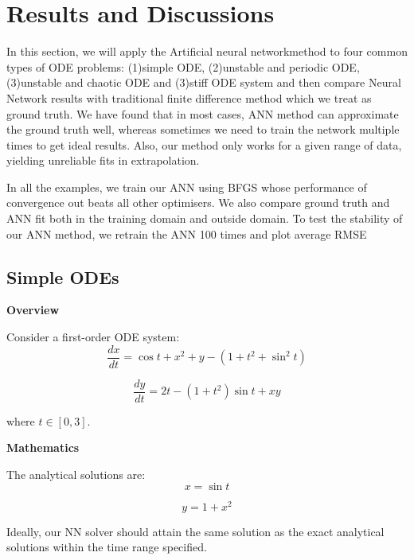 \documentclass[11pt]{article}
\newcommand{\Ann}{Artificial neural network}
\begin{document}
\section{Results and Discussions}

In this section, we will apply the \Ann method to four common types of ODE problems: (1)simple ODE, (2)unstable and periodic ODE, (3)unstable and chaotic ODE and (3)stiff ODE system and then compare Neural Network results with traditional finite difference method which we treat as ground truth. We have found that in most cases, ANN method can approximate the ground truth well, whereas sometimes we need to train the network multiple times to get ideal results. Also, our method only works for a given range of data, yielding unreliable fits in extrapolation. 

In all the examples, we train our ANN using BFGS whose performance of convergence out beats all other optimisers. We also compare ground truth and ANN fit both in the training domain and outside domain. To test the stability of our ANN method, we retrain the ANN 100 times and plot average RMSE

\subsection{Simple ODEs}
\textbf{Overview}

Consider a first-order ODE system:
    \begin{equation}
      \frac{dx}{dt} = \cos t+x^2 + y - (1 + t^2 +\sin^2t)
      \label{eq:simple_eq1}
    \end{equation}
    
     \begin{equation}
      \frac{dy}{dt} = 2t - (1 + t^2)\sin t + xy
      \label{eq:simple_eq2}
    \end{equation}

    
where $t \in [0, 3]$.

\textbf{Mathematics}

The analytical solutions are:
    \begin{equation}
      x = \sin t
      \label{eq:simple_eq3}
    \end{equation}
    
     \begin{equation}
      y= 1 + x^2
      \label{eq:simple_eq4}
    \end{equation}

Ideally, our NN solver should attain the same solution as the exact analytical solutions within the time range specified.
\end{document}
